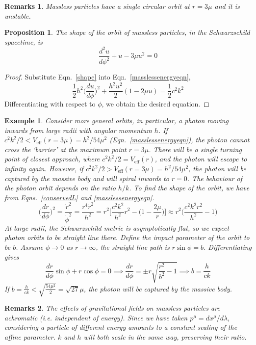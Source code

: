 \documentclass[a4paper]{article}
\newtheorem{eg}{Example}[section]
\newtheorem{remarks}{Remarks}[section]
\theoremstyle{new}
\newtheorem{prop}{Proposition}[section]
\begin{document}
\begin{remarks}
Massless particles have a single circular orbit at $r=3\mu$ and it is unstable.
\end{remarks}
\begin{prop}
The shape of the orbit of massless particles, in the Schwarzschild spacetime, is
\begin{equation}
\frac{d^2u}{d\phi^2}+u-3\mu u^2=0\label{shapemassless}
\end{equation}
\end{prop}
\begin{proof}
Substitute Eqn.~\ref{shape} into Eqn.~\ref{masslessenergyeqn},
$$\frac{1}{2}h^2\bigg(\frac{du}{d\phi}\bigg)^2+\frac{h^2u^2}{2}(1-2\mu u)=\frac{1}{2}c^2k^2$$
Differentiating with respect to $\phi$, we obtain the desired equation.
\end{proof}
\begin{eg}
Consider more general orbits, in particular, a photon moving inwards from large radii with angular momentum $h$. If $c^2k^2/2<V_{\text{eff}}(r=3\mu)=h^2/54\mu^2$ (Eqn.~\ref{masslessenergyeqn}), the photon cannot cross the `barrier' at the maximum point $r=3\mu$. There will be a single turning point of closest approach, where $c^2k^2/2=V_{\text{eff}}(r)$, and the photon will escape to infinity again. However, if $c^2k^2/2>V_{\text{eff}}(r=3\mu)=h^2/54\mu^2$, the photon will be captured by the massive body and will spiral inwards to $r=0$. The behaviour of the photon orbit depends on the ratio $h/k$.
To find the shape of the orbit, we have from Eqns.~\ref{conservedL} and \ref{masslessenergyeqn}.
$$\bigg(\frac{dr}{d\phi}\bigg)^2=\frac{\dot{r}^2}{\dot{\phi}^2}=\frac{r^4\dot{r}^2}{h^2}=r^2\bigg[\frac{c^2k^2}{h^2}r^2-\bigg(1-\frac{2\mu}{r}\bigg)\bigg]\approx r^2\bigg(\frac{c^2k^2r^2}{h^2}-1\bigg)$$
At large radii, the Schwarzschild metric is asymptotically flat, so we expect photon orbits to be straight line there. Define the impact parameter of the orbit to be $b$. Assume $\phi\rightarrow0$ as $r\rightarrow\infty$, the straight line path is $r\sin\phi=b$. Differentiating gives
$$\frac{dr}{d\phi}\sin\phi+r\cos\phi=0\implies\frac{dr}{d\phi}=\pm r\sqrt{\frac{r^2}{b^2}-1}\implies b=\frac{h}{ck}$$
If $b=\frac{h}{ck}<\sqrt{\frac{54\mu^2}{2}}=\sqrt{27}\mu$, the photon will be captured by the massive body.
\end{eg}
\begin{remarks}
The effects of gravitational fields on massless particles are achromatic (i.e. independent of energy). Since we have taken $p^\mu=dx^\mu/d\lambda$, considering a particle of different energy amounts to a constant scaling of the affine parameter. $k$ and $h$ will both scale in the same way, preserving their ratio.
\end{remarks}
\end{document}
